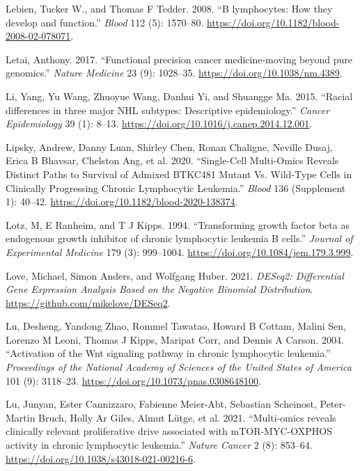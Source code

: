 \documentclass[11pt, a4paper, twosided]{book}
\newenvironment{CSLReferences}%
  {}%
  {\par}
\begin{document}
\begin{CSLReferences}{1}{0}
\leavevmode{}%
Lebien, Tucker W., and Thomas F Tedder. 2008. {``{B lymphocytes: How they develop and function}.''} \emph{Blood} 112 (5): 1570--80. \url{https://doi.org/10.1182/blood-2008-02-078071}.

\leavevmode{}%
Letai, Anthony. 2017. {``{Functional precision cancer medicine-moving beyond pure genomics.}''} \emph{Nature Medicine} 23 (9): 1028--35. \url{https://doi.org/10.1038/nm.4389}.

\leavevmode{}%
Li, Yang, Yu Wang, Zhuoyue Wang, Danhui Yi, and Shuangge Ma. 2015. {``{Racial differences in three major NHL subtypes: Descriptive epidemiology}.''} \emph{Cancer Epidemiology} 39 (1): 8--13. \url{https://doi.org/10.1016/j.canep.2014.12.001}.

\leavevmode{}%
Lipsky, Andrew, Danny Luan, Shirley Chen, Ronan Chaligne, Neville Dusaj, Erica B Bhavsar, Chelston Ang, et al. 2020. {``{Single-Cell Multi-Omics Reveals Distinct Paths to Survival of Admixed BTKC481 Mutant Vs. Wild-Type Cells in Clinically Progressing Chronic Lymphocytic Leukemia}.''} \emph{Blood} 136 (Supplement 1): 40--42. \url{https://doi.org/10.1182/blood-2020-138374}.

\leavevmode{}%
Lotz, M, E Ranheim, and T J Kipps. 1994. {``{Transforming growth factor beta as endogenous growth inhibitor of chronic lymphocytic leukemia B cells.}''} \emph{Journal of Experimental Medicine} 179 (3): 999--1004. \url{https://doi.org/10.1084/jem.179.3.999}.

\leavevmode{}%
Love, Michael, Simon Anders, and Wolfgang Huber. 2021. \emph{DESeq2: Differential Gene Expression Analysis Based on the Negative Binomial Distribution}. \url{https://github.com/mikelove/DESeq2}.

\leavevmode{}%
Lu, Desheng, Yandong Zhao, Rommel Tawatao, Howard B Cottam, Malini Sen, Lorenzo M Leoni, Thomas J Kipps, Maripat Corr, and Dennis A Carson. 2004. {``{Activation of the Wnt signaling pathway in chronic lymphocytic leukemia}.''} \emph{Proceedings of the National Academy of Sciences of the United States of America} 101 (9): 3118--23. \url{https://doi.org/10.1073/pnas.0308648100}.

\leavevmode{}%
Lu, Junyan, Ester Cannizzaro, Fabienne Meier-Abt, Sebastian Scheinost, Peter-Martin Bruch, Holly Ar Giles, Almut Lütge, et al. 2021. {``{Multi-omics reveals clinically relevant proliferative drive associated with mTOR-MYC-OXPHOS activity in chronic lymphocytic leukemia.}''} \emph{Nature Cancer} 2 (8): 853--64. \url{https://doi.org/10.1038/s43018-021-00216-6}.


\end{CSLReferences}
\end{document}
